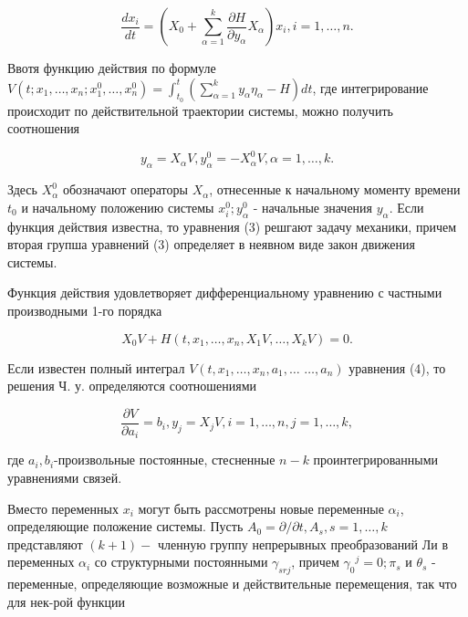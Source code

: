 \documentclass[10pt]{article}
\begin{document}
\[

\frac{d x_{i}}{d t}=\left(X_{0}+\sum_{\alpha=1}^{k} \frac{\partial H}{\partial y_{\alpha}} X_{\alpha}\right) x_{i}, i=1, \ldots, n .

\]



Ввотя функцию действия по формуле $V\left(t ; x_{1}, \ldots, x_{n} ; x_{1}^{0}, \ldots, x_{n}^{0}\right)=\int_{t_{0}}^{t}\left(\sum_{\alpha=1}^{k} y_{\alpha} \eta_{\alpha}-H\right) d t$, где интегрирование происходит по действительной траектории системы, можно получить соотношения



\[

y_{\alpha}=X_{\alpha} V, y_{\alpha}^{0}=-X_{\alpha}^{0} V, \alpha=1, \ldots, k .

\]



Здесь $X_{\alpha}^{0}$ обозначают операторы $X_{\alpha}$, отнесенные к начальному моменту времени $t_{0}$ и начальному положению системы $x_{i}^{0} ; y_{\alpha}^{0}$ - начальные значения $y_{\alpha}$. Если функция действия известна, то уравнения (3) решгают задачу механики, причем вторая групша уравнений (3) определяет в неявном виде закон движения системы.



Функция действия удовлетворяет дифференциальному уравнению с частными производными 1-го порядка



\[

X_{0} V+H\left(t, x_{1}, \ldots, x_{n}, X_{1} V, \ldots, X_{k} V\right)=0 .

\]



Если известен полный интеграл $V\left(t, x_{1}, \ldots, x_{n}, a_{1}, \ldots\right.$ $\left.\ldots, a_{n}\right)$ уравнения (4), то решения Ч. у. определяются соотношениями



\[

\frac{\partial V}{\partial a_{i}}=b_{i}, y_{j}=X_{j} V, i=1, \ldots, n, j=1, \ldots, k,

\]



где $a_{i}, b_{i}$-произвольные постоянные, стесненные $n-k$ проинтегрированными уравнениями связей.



Вместо переменных $x_{i}$ могут быть рассмотрены новые переменные $\alpha_{i}$, определяющие положение системы. Пусть $A_{0}=\partial / \partial t, A_{s}, s=1, \ldots, k$ представляют $(k+1)-$ членную группу непрерывных преобразований Ли в переменных $\alpha_{i}$ со структурными постоянными $\gamma_{s r j}$, причем $\gamma_{0}{ }^{j}=0 ; \pi_{s}$ и $\theta_{s}$ - переменные, определяющие возможные и действительные перемещения, так что для нек-рой функции
\end{document}
